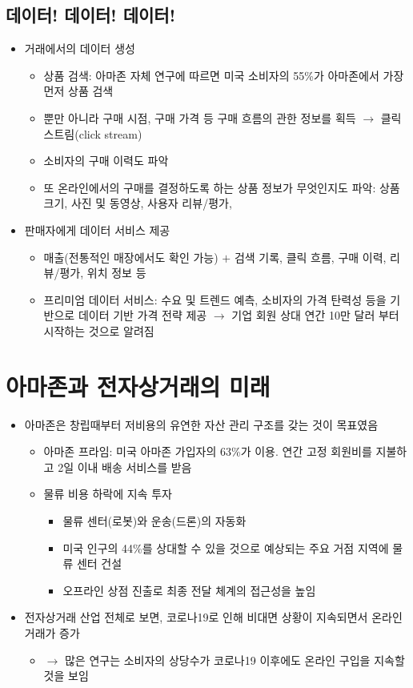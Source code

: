 \subsection{데이터! 데이터! 데이터!}
\begin{itemize}
\item 거래에서의 데이터 생성
	\begin{itemize}
	\item 상품 검색: 아마존 자체 연구에 따르면 미국 소비자의 55\%가 아마존에서 가장 먼저 상품 검색
	\item 뿐만 아니라 구매 시점, 구매 가격 등 구매 흐름의 관한 정보를 획득 $\rightarrow$ 클릭 스트림(click stream)
	\item 소비자의 구매 이력도 파악 
	\item 또 온라인에서의 구매를 결정하도록 하는 상품 정보가 무엇인지도 파악: 상품 크기, 사진 및 동영상, 사용자 리뷰/평가, 
	\end{itemize}
\item 판매자에게 데이터 서비스 제공
	\begin{itemize}
	\item 매출(전통적인 매장에서도 확인 가능) $+$ 검색 기록, 클릭 흐름, 구매 이력, 리뷰/평가, 위치 정보 등
	\item 프리미엄 데이터 서비스: 수요 및 트렌드 예측, 소비자의 가격 탄력성 등을 기반으로 데이터 기반 가격 전략 제공 $\rightarrow$ 기업 회원 상대 연간 10만 달러 부터 시작하는 것으로 알려짐 \citep{Bond:2018ud}
	\end{itemize}
\end{itemize}


\section{아마존과 전자상거래의 미래}\label{sec:aftercovid19}
\begin{itemize}
\item 아마존은 창립때부터 저비용의 유연한 자산 관리 구조를 갖는 것이 목표였음
	\begin{itemize}
	\item 아마존 프라임: 미국 아마존 가입자의 63\%가 이용. 연간 고정 회원비를 지불하고 2일 이내 배송 서비스를 받음
	\item 물류 비용 하락에 지속 투자
		\begin{itemize}
		\item 물류 센터(로봇)와 운송(드론)의 자동화
		\item 미국 인구의 44\%를 상대할 수 있을 것으로 예상되는 주요 거점 지역에 물류 센터 건설
		\item 오프라인 상점 진출로 최종 전달 체계의 접근성을 높임
		\end{itemize}
	\end{itemize}
\item 전자상거래 산업 전체로 보면, 코로나19로 인해 비대면 상황이 지속되면서 온라인 거래가 증가
	\begin{itemize}
	\item $\rightarrow$ 많은 연구는 소비자의 상당수가 코로나19 이후에도 온라인 구입을 지속할 것을 보임	
	\end{itemize}
\end{itemize}

